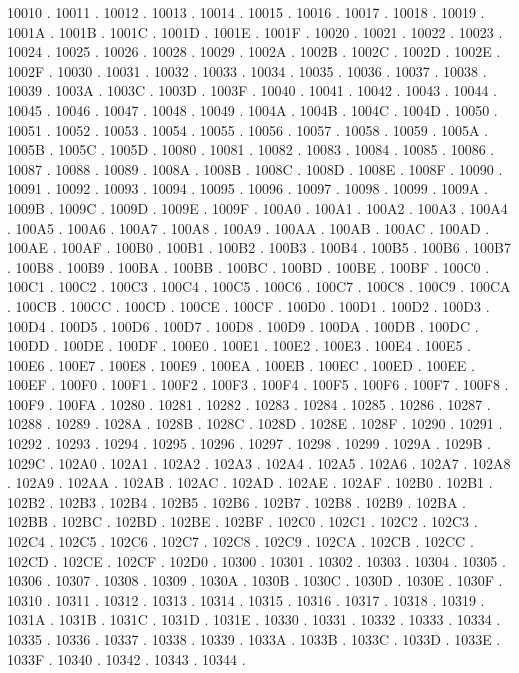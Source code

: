 10010 .
10011 .
10012 .
10013 .
10014 .
10015 .
10016 .
10017 .
10018 .
10019 .
1001A .
1001B .
1001C .
1001D .
1001E .
1001F .
10020 .
10021 .
10022 .
10023 .
10024 .
10025 .
10026 .
10028 .
10029 .
1002A .
1002B .
1002C .
1002D .
1002E .
1002F .
10030 .
10031 .
10032 .
10033 .
10034 .
10035 .
10036 .
10037 .
10038 .
10039 .
1003A .
1003C .
1003D .
1003F .
10040 .
10041 .
10042 .
10043 .
10044 .
10045 .
10046 .
10047 .
10048 .
10049 .
1004A .
1004B .
1004C .
1004D .
10050 .
10051 .
10052 .
10053 .
10054 .
10055 .
10056 .
10057 .
10058 .
10059 .
1005A .
1005B .
1005C .
1005D .
10080 .
10081 .
10082 .
10083 .
10084 .
10085 .
10086 .
10087 .
10088 .
10089 .
1008A .
1008B .
1008C .
1008D .
1008E .
1008F .
10090 .
10091 .
10092 .
10093 .
10094 .
10095 .
10096 .
10097 .
10098 .
10099 .
1009A .
1009B .
1009C .
1009D .
1009E .
1009F .
100A0 .
100A1 .
100A2 .
100A3 .
100A4 .
100A5 .
100A6 .
100A7 .
100A8 .
100A9 .
100AA .
100AB .
100AC .
100AD .
100AE .
100AF .
100B0 .
100B1 .
100B2 .
100B3 .
100B4 .
100B5 .
100B6 .
100B7 .
100B8 .
100B9 .
100BA .
100BB .
100BC .
100BD .
100BE .
100BF .
100C0 .
100C1 .
100C2 .
100C3 .
100C4 .
100C5 .
100C6 .
100C7 .
100C8 .
100C9 .
100CA .
100CB .
100CC .
100CD .
100CE .
100CF .
100D0 .
100D1 .
100D2 .
100D3 .
100D4 .
100D5 .
100D6 .
100D7 .
100D8 .
100D9 .
100DA .
100DB .
100DC .
100DD .
100DE .
100DF .
100E0 .
100E1 .
100E2 .
100E3 .
100E4 .
100E5 .
100E6 .
100E7 .
100E8 .
100E9 .
100EA .
100EB .
100EC .
100ED .
100EE .
100EF .
100F0 .
100F1 .
100F2 .
100F3 .
100F4 .
100F5 .
100F6 .
100F7 .
100F8 .
100F9 .
100FA .
10280 .
10281 .
10282 .
10283 .
10284 .
10285 .
10286 .
10287 .
10288 .
10289 .
1028A .
1028B .
1028C .
1028D .
1028E .
1028F .
10290 .
10291 .
10292 .
10293 .
10294 .
10295 .
10296 .
10297 .
10298 .
10299 .
1029A .
1029B .
1029C .
102A0 .
102A1 .
102A2 .
102A3 .
102A4 .
102A5 .
102A6 .
102A7 .
102A8 .
102A9 .
102AA .
102AB .
102AC .
102AD .
102AE .
102AF .
102B0 .
102B1 .
102B2 .
102B3 .
102B4 .
102B5 .
102B6 .
102B7 .
102B8 .
102B9 .
102BA .
102BB .
102BC .
102BD .
102BE .
102BF .
102C0 .
102C1 .
102C2 .
102C3 .
102C4 .
102C5 .
102C6 .
102C7 .
102C8 .
102C9 .
102CA .
102CB .
102CC .
102CD .
102CE .
102CF .
102D0 .
10300 .
10301 .
10302 .
10303 .
10304 .
10305 .
10306 .
10307 .
10308 .
10309 .
1030A .
1030B .
1030C .
1030D .
1030E .
1030F .
10310 .
10311 .
10312 .
10313 .
10314 .
10315 .
10316 .
10317 .
10318 .
10319 .
1031A .
1031B .
1031C .
1031D .
1031E .
10330 .
10331 .
10332 .
10333 .
10334 .
10335 .
10336 .
10337 .
10338 .
10339 .
1033A .
1033B .
1033C .
1033D .
1033E .
1033F .
10340 .
10342 .
10343 .
10344 .

